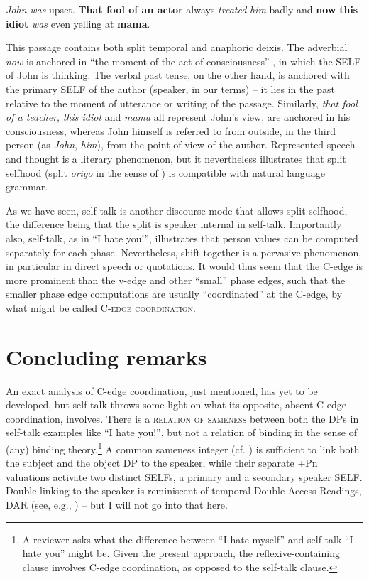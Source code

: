 \documentclass[output=paper]{LSP/langsci}
\begin{document}
\ea%
    \label{ex:Sigurdsson:44}
  	  \emph{John} \emph{was} upset. \textbf{That fool of an actor} always \emph{treated} \emph{him} badly and \textbf{now} \textbf{this idiot} \emph{was} even yelling at \textbf{mama}.
\z

This passage contains both split temporal and anaphoric deixis. The adverbial \textit{now} is anchored in “the moment of the act of consciousness” \citep[99]{Banfield1982}, in which the SELF of John is thinking. The verbal past tense, on the other hand, is anchored with the primary SELF of the author (speaker, in our terms) – it lies in the past relative to the moment of utterance or writing of the passage. Similarly, \textit{that fool of a teacher}, \textit{this idiot} and \textit{mama} all represent John’s view, are anchored in his consciousness, whereas John himself is referred to from outside, in the third person (as \textit{John}, \textit{him}), from the point of view of the author. Represented speech and thought is a literary phenomenon, but it nevertheless illustrates that split selfhood (split \textit{origo} in the sense of \citealt{Bühler1934}) is compatible with natural language grammar.

As we have seen, self-talk is another discourse mode that allows split selfhood, the difference being that the split is speaker internal in self-talk. Importantly also, self-talk, as in “I hate you!”, illustrates that person values can be computed separately for each phase. Nevertheless, shift-together is a pervasive phenomenon, in particular in direct speech or quotations. It would thus seem that the C-edge is more prominent than the v-edge and other “small” phase edges, such that the smaller phase edge computations are usually “coordinated” at the C-edge, by what might be called \textsc{C-edge coordination}.

\section{Concluding remarks}\label{sec:Sigurdsson:5}
\largerpage

An exact analysis of C-edge coordination, just mentioned, has yet to be developed, but self-talk throws some light on what its opposite, absent C-edge coordination, involves. There is a \textsc{relation of sameness} between both the DPs in self-talk examples like “I hate you!”, but not a relation of binding in the sense of (any) binding theory.\footnote{A reviewer asks what the difference between “I hate myself” and self-talk “I hate you” might be. Given the present approach, the reflexive-containing clause involves C-edge coordination, as opposed to the self-talk clause.}  A common sameness integer (cf. \citealt[104]{Baker2003}) is sufficient to link both the subject and the object DP to the speaker, while their separate +Pn valuations activate two distinct SELFs, a primary and a secondary speaker SELF. Double linking to the speaker is reminiscent of temporal Double Access Readings, DAR (see, e.g., \citealt{Giorgi2010,Sigurðsson2016}) – but I will not go into that here.
\end{document}
